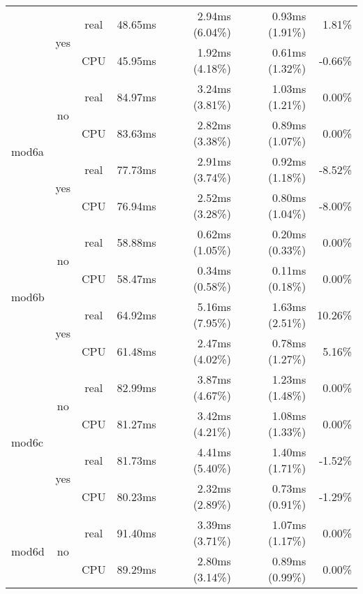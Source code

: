 \documentclass[en]{pracamgr}
\begin{document}
\begin{small}
\begin{longtable}{|l|c|c|r|r|r|r|}
                          \cline{2-7}
                          & \multirow{2}{*}{yes} & real & 48.65ms & 2.94ms (6.04\%) & 0.93ms (1.91\%) & 1.81\% \\*
                          &                      & CPU  & 45.95ms & 1.92ms (4.18\%) & 0.61ms (1.32\%) & -0.66\% \\
\hline
\multirow{4}{*}{mod6a}    & \multirow{2}{*}{no}  & real & 84.97ms & 3.24ms (3.81\%) & 1.03ms (1.21\%) & 0.00\% \\*
                          &                      & CPU  & 83.63ms & 2.82ms (3.38\%) & 0.89ms (1.07\%) & 0.00\% \\*
                          \cline{2-7}
                          & \multirow{2}{*}{yes} & real & 77.73ms & 2.91ms (3.74\%) & 0.92ms (1.18\%) & -8.52\% \\*
                          &                      & CPU  & 76.94ms & 2.52ms (3.28\%) & 0.80ms (1.04\%) & -8.00\% \\
\hline
\multirow{4}{*}{mod6b}    & \multirow{2}{*}{no}  & real & 58.88ms & 0.62ms (1.05\%) & 0.20ms (0.33\%) & 0.00\% \\*
                          &                      & CPU  & 58.47ms & 0.34ms (0.58\%) & 0.11ms (0.18\%) & 0.00\% \\*
                          \cline{2-7}
                          & \multirow{2}{*}{yes} & real & 64.92ms & 5.16ms (7.95\%) & 1.63ms (2.51\%) & 10.26\% \\*
                          &                      & CPU  & 61.48ms & 2.47ms (4.02\%) & 0.78ms (1.27\%) & 5.16\% \\
\hline
\multirow{4}{*}{mod6c}    & \multirow{2}{*}{no}  & real & 82.99ms & 3.87ms (4.67\%) & 1.23ms (1.48\%) & 0.00\% \\*
                          &                      & CPU  & 81.27ms & 3.42ms (4.21\%) & 1.08ms (1.33\%) & 0.00\% \\*
                          \cline{2-7}
                          & \multirow{2}{*}{yes} & real & 81.73ms & 4.41ms (5.40\%) & 1.40ms (1.71\%) & -1.52\% \\*
                          &                      & CPU  & 80.23ms & 2.32ms (2.89\%) & 0.73ms (0.91\%) & -1.29\% \\
\hline
\multirow{4}{*}{mod6d}    & \multirow{2}{*}{no}  & real & 91.40ms & 3.39ms (3.71\%) & 1.07ms (1.17\%) & 0.00\% \\*
                          &                      & CPU  & 89.29ms & 2.80ms (3.14\%) & 0.89ms (0.99\%) & 0.00\% \\*

\end{longtable}
\end{small}
\end{document}
